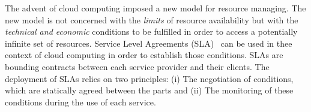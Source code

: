 


The advent of cloud computing imposed a new model for resource managing.
The new model is not concerned with the \textit{limits} of resource availability but with the \textit{technical and economic} conditions to be fulfilled in order to access a potentially infinite set of resources. 
Service Level Agreements (SLA)~\cite{SLA} can be used in thee context of cloud computing in order to establish those conditions.
SLAs are bounding contracts between each service provider and their clients.
The deployment of SLAs relies on two principles: (i) The negotiation of conditions, which are statically agreed between the parts and (ii) The monitoring of these conditions during the use of each service.

